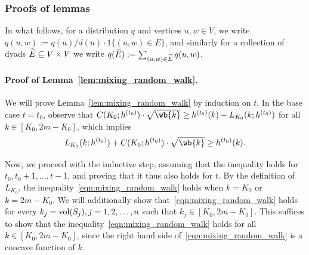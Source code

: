 \subsubsection{Proofs of lemmas}
In what follows, for a distribution $q$ and vertices $u,w \in V$, we write $q(u,w) := q(u)/d(u) \cdot 1\{(u,w) \in E\}$, and similarly for a collection of dyads $\widetilde{E} \subseteq V \times V$ we write $q(\widetilde{E}) := \sum_{(u,w) \in \widetilde{E}} q(u,w)$. 
\paragraph{Proof of Lemma~\ref{lem:mixing_random_walk}.}
	 We will prove Lemma~\ref{lem:mixing_random_walk} by induction on $t$. In the base case $t = t_0$, observe that $C(K_0;h^{(t_0)}) \cdot \sqrt{\wb{k}} \geq h^{(t_0)}(k) - L_{K_0}(k;h^{(t_0)})$ for all $k \in [K_0, 2m - K_0]$, which implies 
	\begin{equation*}
	L_{K_0}(k;h^{(t_0)}) + C(K_0; h^{(t_0)}) \cdot \sqrt{\wb{k}} \geq h^{(t_0)}(k).
	\end{equation*}
	
	Now, we proceed with the inductive step, assuming that the inequality holds for $t_0,t_0 + 1,\ldots,t - 1$, and proving that it thus also holds for $t$. By the definition of $L_{K_0}$, the inequality~\eqref{eqn:mixing_random_walk} holds when $k = K_0$ or $k = 2m - K_0$. We will additionally show that~\eqref{eqn:mixing_random_walk} holds for every $k_j = \mathrm{vol}(S_j), j = 1,2,\ldots,n$ such that $k_j \in [K_0, 2m - K_0]$. This suffices to show that the inequality~\eqref{eqn:mixing_random_walk} holds for all $k \in [K_0,2m - K_0]$, since the right hand side of~\eqref{eqn:mixing_random_walk} is a concave function of $k$.
	
